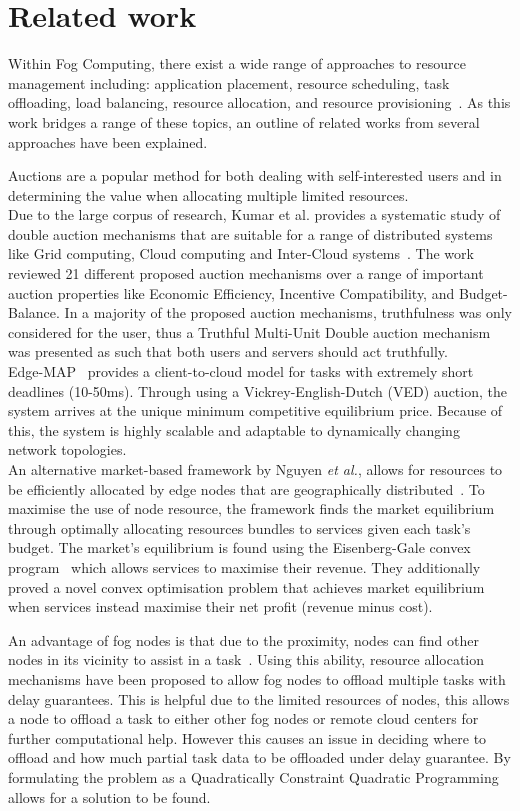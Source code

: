 \section{Related work}
\label{sec:related-work}
Within Fog Computing, there exist a wide range of approaches to resource management including:
application placement, resource scheduling, task offloading, load balancing, resource allocation,
and resource provisioning~\cite{ghobaei2019resource}. As this work bridges a range of these topics, an outline of
related works from several approaches have been explained.

Auctions are a popular method for both dealing with self-interested users and in determining the value when allocating
multiple limited resources. \\
Due to the large corpus of research, Kumar et al. provides a systematic study of double auction mechanisms that are
suitable for a range of distributed systems like Grid computing, Cloud computing and Inter-Cloud
systems~\cite{KUMAR2017234}. The work reviewed 21 different proposed auction mechanisms over a range of important auction
properties like Economic Efficiency, Incentive Compatibility, and Budget-Balance. In a majority of the proposed auction
mechanisms, truthfulness was only considered for the user, thus a Truthful Multi-Unit Double auction mechanism was
presented as such that both users and servers should act truthfully. \\
Edge-MAP~\cite{tasiopoulos2018edge} provides a client-to-cloud model for tasks with extremely short deadlines
(10-50ms). Through using a Vickrey-English-Dutch (VED) auction, the system arrives at the unique minimum competitive
equilibrium price. Because of this, the system is highly scalable and adaptable to dynamically changing network
topologies. \\
An alternative market-based framework by Nguyen \emph{et al.}, allows for resources to be efficiently allocated by edge nodes
that are geographically distributed~\cite{8373684}. To maximise the use of node resource, the framework finds the market
equilibrium through optimally allocating resources bundles to services given each task's budget. The market's
equilibrium is found using the Eisenberg-Gale convex program~\cite{JAIN201084} which allows services to maximise their revenue. They
additionally proved a novel convex optimisation problem that achieves market equilibrium when services instead maximise
their net profit (revenue minus cost).

An advantage of fog nodes is that due to the proximity, nodes can find other nodes in its vicinity to assist in a
task~\cite{8839780}. Using this ability, resource allocation mechanisms have been proposed to allow fog nodes to offload
multiple tasks with delay guarantees. This is helpful due to the limited resources of nodes, this allows a node to
offload a task to either other fog nodes or remote cloud centers for further computational help. However this causes an
issue in deciding where to offload and how much partial task data to be offloaded under delay guarantee. By formulating
the problem as a Quadratically Constraint Quadratic Programming allows for a solution to be found.

